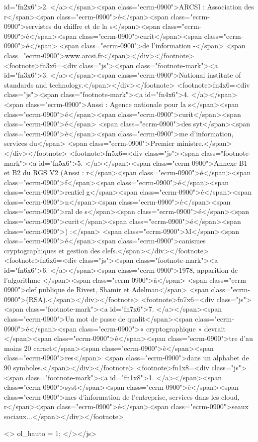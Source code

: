  id="fn2x6">2. </a></span><span 
class="ecrm-0900">ARCSI : Association des r</span><span 
class="ecrm-0900">é</span><span 
class="ecrm-0900">servistes du chiffre et de la s</span><span 
class="ecrm-0900">é</span><span 
class="ecrm-0900">curit</span><span 
class="ecrm-0900">é</span> <span 
class="ecrm-0900">de l’information -</span>
  <span 
class="ecrm-0900">www.arcsi.fr</span></div></footnote> 
<footnote>fn3x6=<div class="js"><span class="footnote-mark"><a 
 id="fn3x6">3. </a></span><span 
class="ecrm-0900">National institute of standards and technology.</span></div></footnote> 
<footnote>fn4x6=<div class="js"><span class="footnote-mark"><a 
 id="fn4x6">4. </a></span><span 
class="ecrm-0900">Anssi : Agence nationale pour la s</span><span 
class="ecrm-0900">é</span><span 
class="ecrm-0900">curit</span><span 
class="ecrm-0900">é</span> <span 
class="ecrm-0900">des syt</span><span 
class="ecrm-0900">è</span><span 
class="ecrm-0900">me d’information, services du</span>
  <span 
class="ecrm-0900">Premier ministre.</span></div></footnote> 
<footnote>fn5x6=<div class="js"><span class="footnote-mark"><a 
 id="fn5x6">5. </a></span><span 
class="ecrm-0900">Annexe B1 et B2 du RGS V2 (Anssi : r</span><span 
class="ecrm-0900">é</span><span 
class="ecrm-0900">f</span><span 
class="ecrm-0900">é</span><span 
class="ecrm-0900">rentiel g</span><span 
class="ecrm-0900">é</span><span 
class="ecrm-0900">n</span><span 
class="ecrm-0900">é</span><span 
class="ecrm-0900">ral de s</span><span 
class="ecrm-0900">é</span><span 
class="ecrm-0900">curit</span><span 
class="ecrm-0900">é</span><span 
class="ecrm-0900">) :</span>
  <span 
class="ecrm-0900">M</span><span 
class="ecrm-0900">é</span><span 
class="ecrm-0900">canismes cryptographiques et gestion des clefs.</span></div></footnote> 
<footnote>fn6x6=<div class="js"><span class="footnote-mark"><a 
 id="fn6x6">6. </a></span><span 
class="ecrm-0900">1978, apparition de l’algorithme </span><span 
class="ecrm-0900">à</span> <span 
class="ecrm-0900">clef publique de Rivest, Shamir et Adelman</span>
  <span 
class="ecrm-0900">(RSA).</span></div></footnote> 
<footnote>fn7x6=<div class="js"><span class="footnote-mark"><a 
 id="fn7x6">7. </a></span><span 
class="ecrm-0900">Un mot de passe de qualit</span><span 
class="ecrm-0900">é</span><span 
class="ecrm-0900">« cryptographique  » devrait </span><span 
class="ecrm-0900">ê</span><span 
class="ecrm-0900">tre d’au moins 20 caract</span><span 
class="ecrm-0900">è</span><span 
class="ecrm-0900">res</span>
  <span 
class="ecrm-0900">dans un alphabet de 90 symboles.</span></div></footnote> 
<footnote>fn1x8=<div class="js"><span class="footnote-mark"><a 
 id="fn1x8">1. </a></span><span 
class="ecrm-0900">syst</span><span 
class="ecrm-0900">è</span><span 
class="ecrm-0900">mes d’information de l’entreprise, services dans les cloud, r</span><span 
class="ecrm-0900">é</span><span 
class="ecrm-0900">seaux sociaux...</span></div></footnote> 

   <>     ol_hauto = 1;                                                                                              </></js>